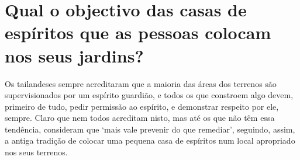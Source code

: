 \section{Qual o objectivo das casas de espíritos que as pessoas colocam nos seus
  jardins?}

Os tailandeses sempre acreditaram que a maioria das áreas dos terrenos
são supervisionados por um espírito guardião, e todos os que constroem
algo devem, primeiro de tudo, pedir permissão ao espírito, e demonstrar
respeito por ele, sempre. Claro que nem todos acreditam nisto, mas até
os que não têm essa tendência, consideram que `mais vale prevenir do
que remediar', seguindo, assim, a antiga tradição de colocar uma
pequena casa de espíritos num local apropriado nos seus terrenos.
